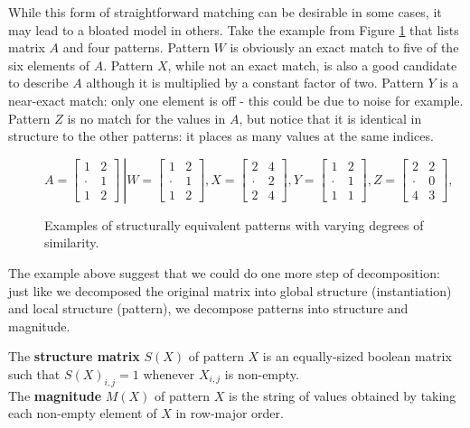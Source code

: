 \documentclass{llncs}
\begin{document}
While this form of straightforward matching can be desirable in some cases, it may lead to a bloated model in others. Take the example from Figure \ref{example3} that lists matrix $A$ and four patterns. Pattern $W$ is obviously an exact match to five of the six elements of $A$. Pattern $X$, while not an exact match, is also a good candidate to describe $A$ although it is multiplied by a constant factor of two. Pattern $Y$ is a near-exact match: only one element is off - this could be due to noise for example. Pattern $Z$ is no match for the values in $A$, but notice that it is identical in structure to the other patterns: it places as many values at the same indices. 

\begin{figure}
\small
$$
\left.
A =
\begin{bmatrix}
1 & 2 \\[-.2em]
\cdot & 1 \\[-.2em]
1 & 2
\end{bmatrix}\
\right\rvert
W =
\begin{bmatrix}
1 & 2 \\[-.2em]
\cdot & 1 \\[-.2em]
1 & 2
\end{bmatrix}\!\!,
X =
\begin{bmatrix}
2 & 4 \\[-.2em]
\cdot & 2 \\[-.2em]
2 & 4
\end{bmatrix}\!\!,
Y =
\begin{bmatrix}
1 & 2 \\[-.2em]
\cdot & 1 \\[-.2em]
1 & 1
\end{bmatrix}\!\!,
Z =
\begin{bmatrix}
2 & 2 \\[-.2em]
\cdot & 0 \\[-.2em]
4 & 3
\end{bmatrix}\!\!,
$$
\caption{Examples of structurally equivalent patterns with varying degrees of similarity.}
\label{example3}
\end{figure}

The example above suggest that we could do one more step of decomposition: just like we decomposed the original matrix into global structure (instantiation) and local structure (pattern), we decompose patterns into structure and magnitude. 

\begin{definition}
The \textbf{structure matrix} $S(X)$ of pattern $X$ is an equally-sized boolean matrix such that $S(X)_{i,j}=1$ whenever $X_{i,j}$ is non-empty.\\
The \textbf{magnitude} $M(X)$ of pattern $X$ is the string of values obtained by taking each non-empty element of $X$ in row-major order.
\end{definition}
\end{document}
